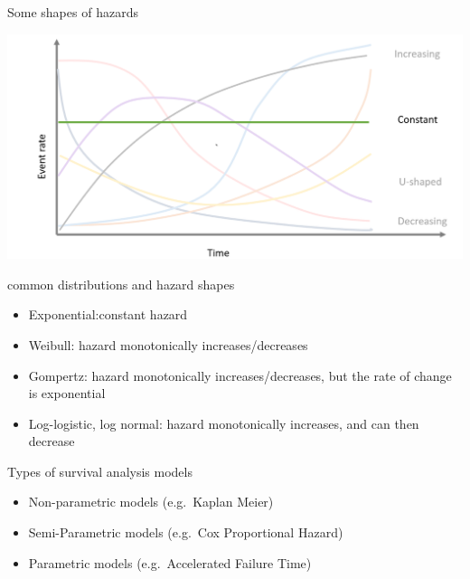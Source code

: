 \documentclass[
  ignorenonframetext,
]{beamer}
\providecommand{\tightlist}{%
  \setlength{\itemsep}{0pt}\setlength{\parskip}{0pt}}
\begin{document}
\begin{frame}{Some shapes of hazards}
\protect\hypertarget{some-shapes-of-hazards}{}

\includegraphics[width=1\linewidth]{figures/hazards}

\end{frame}

\begin{frame}{common distributions and hazard shapes}
\protect\hypertarget{common-distributions-and-hazard-shapes}{}

\begin{itemize}
\tightlist
\item
  Exponential:constant hazard
\item
  Weibull: hazard monotonically increases/decreases
\item
  Gompertz: hazard monotonically increases/decreases, but the rate of
  change is exponential
\item
  Log-logistic, log normal: hazard monotonically increases, and can then
  decrease
\end{itemize}

\end{frame}

\begin{frame}{Types of survival analysis models}
\protect\hypertarget{types-of-survival-analysis-models}{}

\begin{itemize}
\tightlist
\item
  Non-parametric models (e.g.~Kaplan Meier)
\item
  Semi-Parametric models (e.g.~Cox Proportional Hazard)
\item
  Parametric models (e.g.~Accelerated Failure Time)
\end{itemize}

\end{frame}
\end{document}
